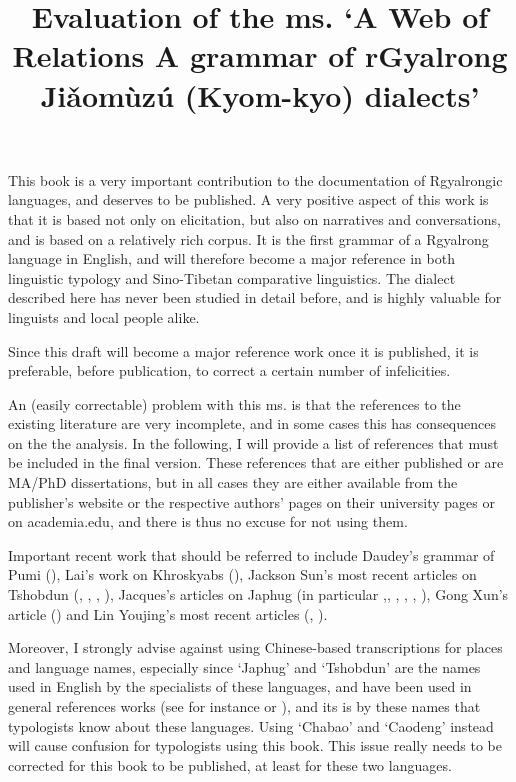 \documentclass[oldfontcommands,oneside,a4paper,11pt]{article}
\begin{document}
 
\title{Evaluation of the ms. `A Web of Relations A grammar of rGyalrong Jiǎomùzú (Kyom-kyo) dialects'} 
\maketitle 
\sloppy

 This book is a very important contribution to the documentation of Rgyalrongic languages, and deserves to be published. A very positive aspect of this work is that it is based not only on elicitation, but also on narratives and conversations, and is based on a relatively rich corpus. It is the first grammar of a Rgyalrong language in English, and will therefore become a major reference in both linguistic typology and Sino-Tibetan comparative linguistics.  The dialect described here has never been studied in detail before, and is highly valuable for linguists and local people alike.
 
Since this draft will become a major reference work once it is published, it is preferable, before publication, to correct a certain number of infelicities.

An (easily correctable) problem with this ms. is that the references to the existing literature are very incomplete, and in some cases this has consequences on the the analysis. In the following, I will provide a list of references that must be included in the final version. These references that are either published or are MA/PhD dissertations, but in all cases they are either available from the publisher's website or the respective authors' pages on their university pages or on academia.edu, and there is thus no excuse for not using them.

Important recent work that should be referred to include Daudey's grammar of Pumi (\citealt{daudey14grammar}), Lai's work on Khroskyabs (\citealt{lai13affixale}), Jackson Sun's most recent articles on Tshobdun (\citet{sun12complementation}, \citet{sun14generic}, \citet{jackson07irrealis}, \citet{jackson14morpho}), Jacques's articles on Japhug (in particular \citet{jacques13tropative},\citet{jacques12incorp}, \citet{jacques13harmonization}, \citet{japhug14ideophones}, \citet{jacques14linking}, \citet{jacques14antipassive}), Gong Xun's article (\citealt{gongxun14agreement}) and Lin Youjing's most recent articles (\citealt{lin11direction},  \citealt{linyj12tone}).

Moreover, I strongly advise against using Chinese-based transcriptions for places and language names, especially since `Japhug' and `Tshobdun' are the names used in English by the specialists of these languages, and have been used in general references works (see for instance \citealt{jackson14morpho} or \citealt{jacques13harmonization}), and its is by these names that typologists know about these languages. Using `Chabao' and `Caodeng' instead will cause confusion for typologists using this book. This issue really needs to be corrected for this book to be published, at least for these two languages.
\end{document}
